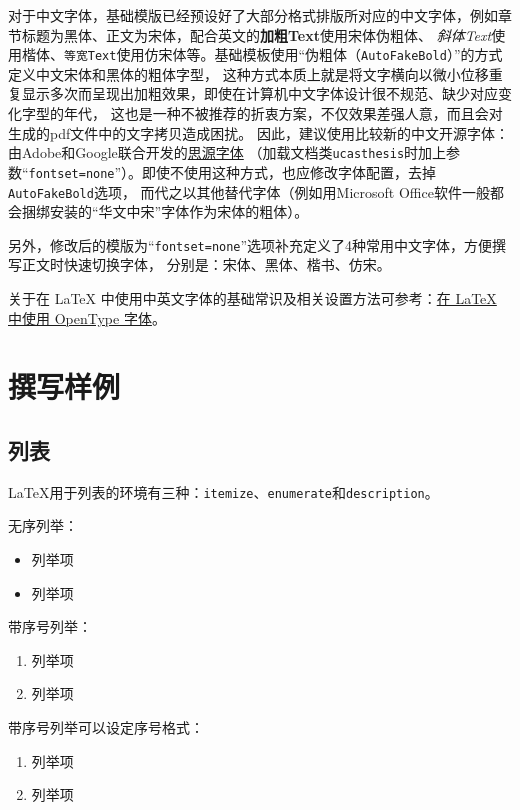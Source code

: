 对于中文字体，基础模版已经预设好了大部分格式排版所对应的中文字体，例如章节标题为黑体、正文为宋体，配合英文的\textbf{加粗Text}使用宋体伪粗体、
\textit{斜体Text}使用楷体、\texttt{等宽Text}使用仿宋体等。基础模板使用“伪粗体（\texttt{AutoFakeBold}）”的方式定义中文宋体和黑体的粗体字型，
这种方式本质上就是将文字横向以微小位移重复显示多次而呈现出加粗效果，即使在计算机中文字体设计很不规范、缺少对应变化字型的年代，
这也是一种不被推荐的折衷方案，不仅效果差强人意，而且会对生成的pdf文件中的文字拷贝造成困扰。
因此，建议使用比较新的中文开源字体：由Adobe和Google联合开发的\href{https://github.com/adobe-fonts}{思源字体}
（加载文档类\texttt{ucasthesis}时加上参数“\texttt{fontset=none}”）。即使不使用这种方式，也应修改字体配置，去掉\texttt{AutoFakeBold}选项，
而代之以其他替代字体（例如用Microsoft Office软件一般都会捆绑安装的“华文中宋”字体作为宋体的粗体）。

另外，修改后的模版为“\texttt{fontset=none}”选项补充定义了4种常用中文字体，方便撰写正文时快速切换字体，
分别是：{\songti 宋体}、{\heiti 黑体}、{\kaishu 楷书}、{\fangsong 仿宋}。

关于在 \LaTeX{} 中使用中英文字体的基础常识及相关设置方法可参考：\href{https://stone-zeng.github.io/2018-08-08-use-opentype-fonts/}{在 \LaTeX{} 中使用 OpenType 字体}。

\section{撰写样例}\label{sec:samples}

\subsection{列表}
\LaTeX 用于列表的环境有三种：\texttt{itemize}、\texttt{enumerate}和\texttt{description}。

无序列举：
\begin{itemize}
	\item 列举项
	\item 列举项
\end{itemize}

带序号列举：
\begin{enumerate}
	\item 列举项
	\item 列举项
\end{enumerate}

带序号列举可以设定序号格式：
\begin{enumerate}[1).]
	\item 列举项
	\item 列举项
\end{enumerate}

